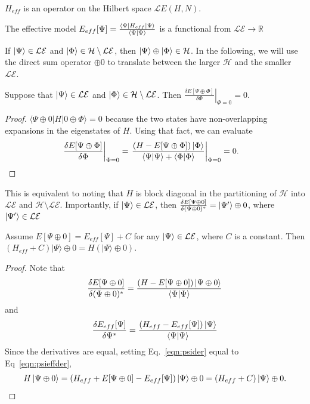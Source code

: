 \begin{definition}
$H_{eff}$ is an operator on the Hilbert space ${\mathcal LE(H,N)}$.	 
\end{definition}

\begin{definition}
The effective model $E_{eff}[\Psi]=\frac{\bra{\Psi}H_{eff}\ket{\Psi}}{\braket{\Psi|\Psi}}$ is a functional from $\mathcal{LE} \rightarrow \mathbb{R}$
\end{definition}

If $\ket{\Psi}\in \mathcal{LE}$ and $\ket{\Phi}\in {\mathcal H} \setminus \mathcal{LE}$, then $\ket{\Psi} \oplus \ket{\Phi} \in {\mathcal H}$.
In the following, we will use the direct sum operator $\oplus 0$ to translate between the larger ${\mathcal H}$ and the smaller $\mathcal{LE}$. 

\begin{lemma}
\label{lemma:zeroderiv}
Suppose that $\ket{\Psi}\in \mathcal{LE}$ and $\ket{\Phi} \in {\mathcal H} \setminus \mathcal{LE}$. 
Then $\left.\frac{\delta E[\Psi \oplus \Phi]}{\delta \Phi}\right|_{\Phi=0}=0$. 
\end{lemma}
\begin{proof}
$\langle \Psi\oplus 0 | H | 0\oplus \Phi \rangle=0$ because the two states have non-overlapping expansions in the eigenstates of $H$. 
Using that fact, we can evaluate
\begin{align}
\left.\frac{\delta E[\Psi \oplus \Phi]}{\delta \Phi}\right|_{\Phi=0} &= \left.\frac{\left(H-E[\Psi\oplus\Phi]\right) \ket{\Phi} }{\braket{\Psi|\Psi} + \braket{\Phi|\Phi}} \right|_{\Phi=0} = 0.
\end{align}
\end{proof}
This is equivalent to noting that $H$ is block diagonal in the partitioning of ${\mathcal H}$ into $\mathcal{LE}$ and ${\mathcal H} \setminus \mathcal{LE}$.
Importantly, if $\ket{\Psi} \in \mathcal{LE}$, then $\frac{\delta  E[\Psi\oplus 0] }{\delta (\Psi\oplus 0)^*} = \ket{\Psi'} \oplus 0$, where $\ket{\Psi'} \in \mathcal{LE} $

\begin{theorem}
\label{theorem:matching}
Assume $ E[\Psi\oplus 0]  = E_{eff}[\Psi]+C$ for any $\ket{\Psi } \in \mathcal{LE}$, where $C$ is a constant. 
Then $(H_{eff}+C)|\Psi\rangle\oplus 0 = H (|\Psi\rangle \oplus 0)$.
\end{theorem}
\begin{proof}
Note that
\begin{align}
	\frac{\delta E[\Psi\oplus 0]}{\delta (\Psi\oplus 0)^*}=\frac{(H-E[\Psi\oplus 0])\ket{\Psi\oplus 0} }{\braket{\Psi|\Psi}}
	\label{eqn:psider}
\end{align}
and 
\begin{align}
	\frac{\delta E_{eff}[\Psi]}{\delta \Psi^*}=\frac{(H_{eff}-E_{eff}[\Psi])\ket{\Psi} }{\braket{\Psi|\Psi}}
	\label{eqn:psieffder}
\end{align}
Since the derivatives are equal, setting Eq.~\eqref{eqn:psider} equal to Eq~\eqref{eqn:psieffder},
\begin{align}
	 H\ket{\Psi\oplus 0}= (H_{eff}+E[\Psi\oplus 0]-E_{eff}[\Psi])\ket{\Psi}\oplus 0 =(H_{eff}+C)\ket{\Psi}\oplus 0.
\end{align}
\end{proof}


